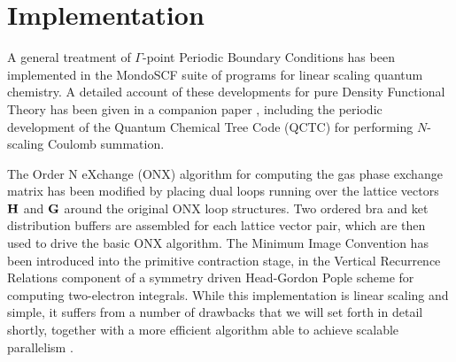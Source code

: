 \documentclass[prb,aps,nobibnotes,twocolumn,doublespace,twocolumngrid,superbib,showpacs]{revtex4}
\begin{document}

\section{Implementation}\label{implementation}

A general treatment of $\Gamma$-point Periodic Boundary Conditions has been implemented in the MondoSCF
suite of programs for linear scaling quantum chemistry.  A detailed account of these developments for 
pure Density Functional Theory has been given in a companion paper \cite{CTymczak04A}, including the periodic 
development of the Quantum Chemical Tree Code ({\sc QCTC}) for performing $N$-scaling Coulomb summation.  

The Order N eXchange ({\sc ONX}) algorithm \cite{ESchwegler97} for computing the gas phase exchange matrix 
has been modified by placing dual loops running over the lattice vectors 
${\bf H}$ and ${\bf G}$ around the original ONX loop structures.  Two ordered bra and ket distribution 
buffers are assembled for each lattice vector pair, which are then used to drive the basic {\sc ONX} algorithm.
The Minimum Image Convention has been introduced into the primitive contraction stage, in the 
Vertical Recurrence Relations component of a symmetry driven Head-Gordon Pople \cite{MHeadgordon88} scheme for 
computing two-electron integrals.  While this implementation is linear scaling and simple, it suffers 
from a number of drawbacks that we will set forth in detail shortly, together with a more efficient 
algorithm able to achieve scalable parallelism \cite{}.

\end{document}
